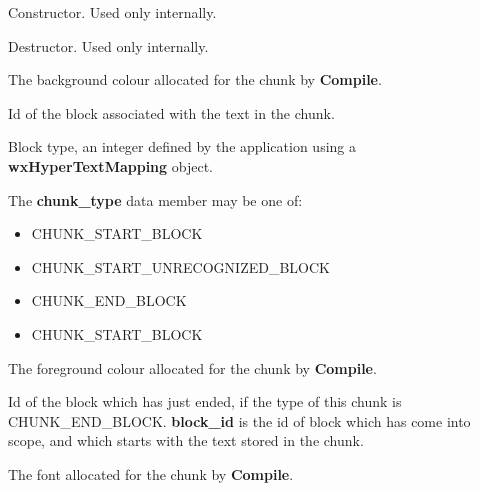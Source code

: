 Constructor. Used only internally.



Destructor. Used only internally.



The background colour allocated for the chunk by {\bf Compile}.



Id of the block associated with the text in the chunk.



Block type, an integer defined by the application using a {\bf wxHyperTextMapping}
object.



The {\bf chunk\_type} data member may be one of:

\begin{itemize}
\item CHUNK\_START\_BLOCK
\item CHUNK\_START\_UNRECOGNIZED\_BLOCK
\item CHUNK\_END\_BLOCK
\item CHUNK\_START\_BLOCK
\end{itemize}



The foreground colour allocated for the chunk by {\bf Compile}.



Id of the block which has just ended, if the type of this chunk is CHUNK\_END\_BLOCK.
{\bf block\_id} is the id of block which has come into scope, and which starts with the
text stored in the chunk.



The font allocated for the chunk by {\bf Compile}.

